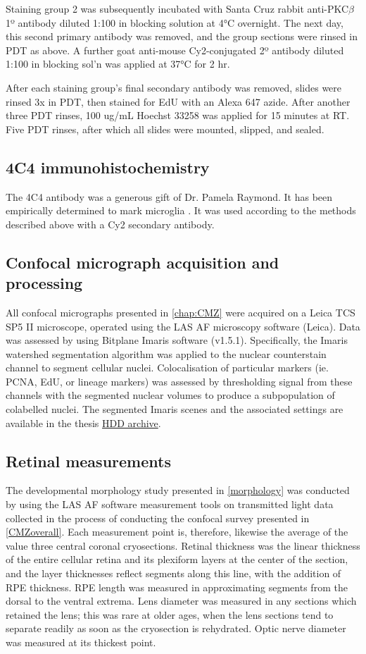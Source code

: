 \documentclass{ut-thesis}
\begin{document}
\begin{NoHyper}
Staining group 2 was subsequently incubated with Santa Cruz rabbit anti-PKC$\beta$ 1º antibody diluted 1:100 in blocking solution at 4°C overnight. The next day, this second primary antibody was removed, and the group sections were rinsed in PDT as above. A further goat anti-mouse Cy2-conjugated 2º antibody diluted 1:100 in blocking sol’n was applied at 37°C for 2 hr.

After each staining group's final secondary antibody was removed, slides were rinsed 3x in PDT, then stained for EdU with an Alexa 647 azide. After another three PDT rinses, 100 ug/mL Hoechst 33258 was applied for 15 minutes at RT. Five PDT rinses, after which all slides were mounted, slipped, and sealed.

\subsection{4C4 immunohistochemistry}
\label{ssec:CMZ4C4histo}
The 4C4 antibody was a generous gift of Dr. Pamela Raymond. It has been empirically determined to mark microglia \cite{Becker2001}. It was used according to the methods described above with a Cy2 secondary antibody.

\subsection{Confocal micrograph acquisition and processing}
All confocal micrographs presented in \autoref{chap:CMZ} were acquired on a Leica TCS SP5 II microscope, operated using the LAS AF microscopy software (Leica). Data was assessed by using Bitplane Imaris software (v1.5.1). Specifically, the Imaris watershed segmentation algorithm was applied to the nuclear counterstain channel to segment cellular nuclei. Colocalisation of particular markers (ie. PCNA, EdU, or lineage markers) was assessed by thresholding signal from these channels with the segmented nuclear volumes to produce a subpopulation of colabelled nuclei. The segmented Imaris scenes and the associated settings are available in the thesis \hyperref[sec:archive]{HDD archive}.

\subsection{Retinal measurements}
\label{ssec:CMZretmeas}
The developmental morphology study presented in \autoref{morphology} was conducted by using the LAS AF software measurement tools on transmitted light data collected in the process of conducting the confocal survey presented in \autoref{CMZoverall}. Each measurement point is, therefore, likewise the average of the value three central coronal cryosections. Retinal thickness was the linear thickness of the entire cellular retina and its plexiform layers at the center of the section, and the layer thicknesses reflect segments along this line, with the addition of RPE thickness. RPE length was measured in approximating segments from the dorsal to the ventral extrema. Lens diameter was measured in any sections which retained the lens; this was rare at older ages, when the lens sections tend to separate readily as soon as the cryosection is rehydrated. Optic nerve diameter was measured at its thickest point.


\end{NoHyper}
\end{document}
